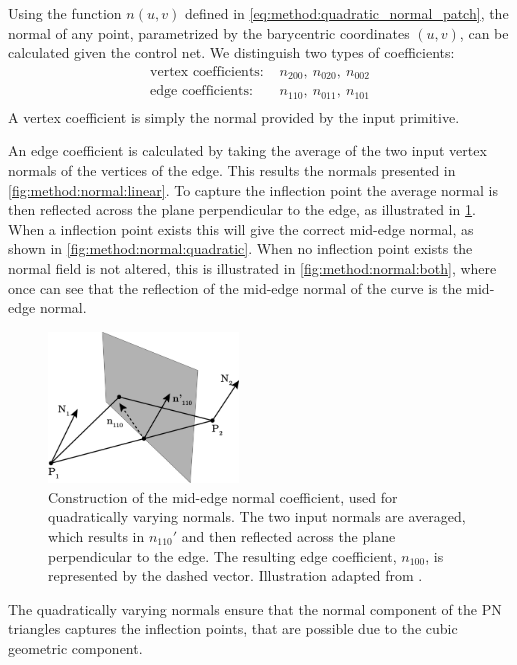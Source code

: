 	Using the function $n(u,v)$ defined in \eqref{eq:method:quadratic_normal_patch}, the normal of any point, parametrized by the barycentric coordinates $(u,v)$, can be calculated given the control net. We distinguish two types of coefficients:
	\begin{align*}
		\text{vertex coefficients: } {}&  n_{200},\ n_{020},\ n_{002} \\
		\text{edge coefficients: } {}&  n_{110},\ n_{011},\ n_{101}\\
	\end{align*}
	A vertex coefficient is simply the normal provided by the input primitive.

	An edge coefficient is calculated by taking the average of the two input vertex normals of the vertices of the edge. This results the normals presented in \cref{fig:method:normal:linear}. To capture the inflection point the average normal is then reflected across the plane perpendicular to the edge, as illustrated in \cref{fig:method:normal:reflection}. When a inflection point exists this will give the correct mid-edge normal, as shown in \cref{fig:method:normal:quadratic}. When no inflection point exists the normal field is not altered, this is illustrated in \cref{fig:method:normal:both}, where once can see that the reflection of the mid-edge normal of the curve is the mid-edge normal.

	\begin{figure}
		\centering
		\includegraphics[width=0.45\textwidth]{./content/img/method/normal_reflection.png}
		\caption{Construction of the mid-edge normal coefficient, used for quadratically varying normals. The two input normals are averaged, which results in $n_{110}'$ and then reflected across the plane perpendicular to the edge. The resulting edge coefficient, $n_{100}$, is represented by the dashed vector. Illustration adapted from \textcite{vlachos2001curved}.}
		\label{fig:method:normal:reflection}
	\end{figure}


	The quadratically varying normals ensure that the normal component of the PN triangles captures the inflection points, that are possible due to the cubic geometric component. 

